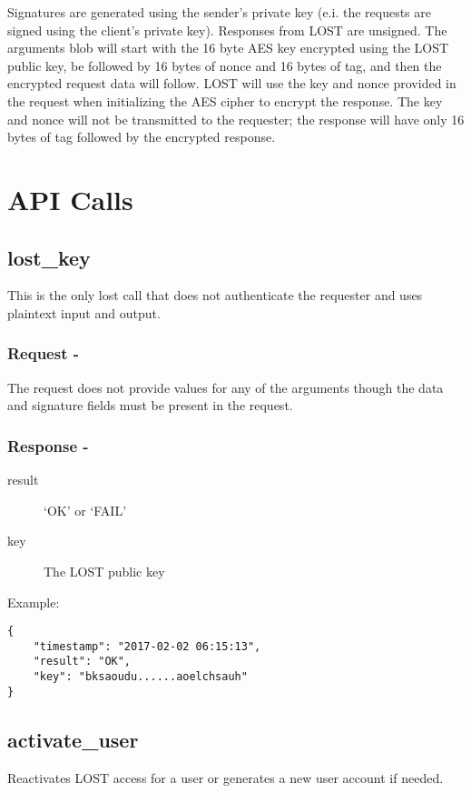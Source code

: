 Signatures are generated using the sender's private key (e.i. the requests are signed using the client's private key). Responses from LOST are unsigned. The arguments blob will start with the 16 byte AES key encrypted using the LOST public key, be followed by 16 bytes of nonce and 16 bytes of tag, and then the encrypted request data will follow. LOST will use the key and nonce provided in the request when initializing the AES cipher to encrypt the response. The key and nonce will not be transmitted to the requester; the response will have only 16 bytes of tag followed by the encrypted response. 


\section*{API Calls}
\subsection*{lost\_key}
This is the only lost call that does not authenticate the requester and uses plaintext input and output.
\\
\subsubsection*{Request -}
The request does not provide values for any of the arguments though the data and signature fields must be present in the request.

\subsubsection*{Response -}
\begin{description}
\item[result] `OK' or `FAIL'
\item[key] The LOST public key
\end{description}

\noindent Example:
\begin{verbatim}
{
    "timestamp": "2017-02-02 06:15:13",
    "result": "OK",
    "key": "bksaoudu......aoelchsauh"
}
\end{verbatim}



\subsection*{activate\_user}
Reactivates LOST access for a user or generates a new user account if needed.
\\

